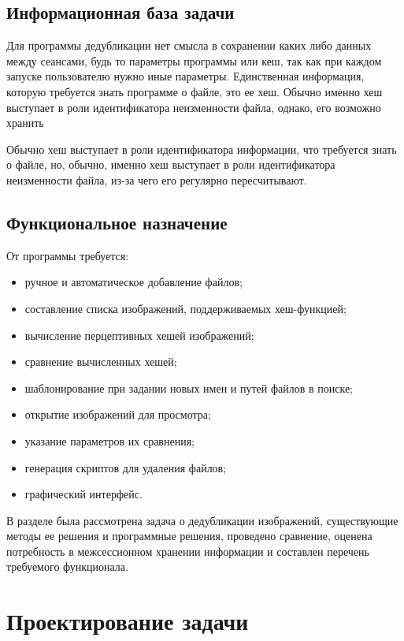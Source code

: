 \documentclass[variant=courcework]{bsuir}
\begin{document}

\section{Информационная база задачи}

Для программы дедубликации нет смысла в сохранении каких либо данных между
сеансами, будь то параметры программы или кеш, так как при каждом запуске
пользователю нужно иные параметры. Единственная информация, которую требуется
знать программе о файле, это ее хеш. Обычно именно хеш выступает в роли
идентификатора неизменности файла, однако, его возможно хранить

Обычно хеш выступает в роли идентификатора
информации,   что требуется знать о файле, но, обычно, именно хеш выступает в
роли идентификатора неизменности файла, из-за чего его регулярно пересчитывают.

\section{Функциональное назначение}

От программы требуется:

\begin{itemize}
    \item ручное и автоматическое добавление файлов;
    \item составление списка изображений, поддерживаемых хеш-функцией;
    \item вычисление перцептивных хешей изображений;
    \item сравнение вычисленных хешей;
    \item шаблонирование при задании новых имен и путей файлов в поиске;
    \item открытие изображений для просмотра;
    \item указание параметров их сравнения;
    \item генерация скриптов для удаления файлов;
    \item графический интерфейс.\\
\end{itemize}

В разделе была рассмотрена задача о дедубликации изображений, существующие
методы ее решения и программные решения, проведено сравнение, оценена
потребность в межсессионном хранении информации и составлен перечень требуемого
функционала.

\chapter{Проектирование задачи}
\end{document}
